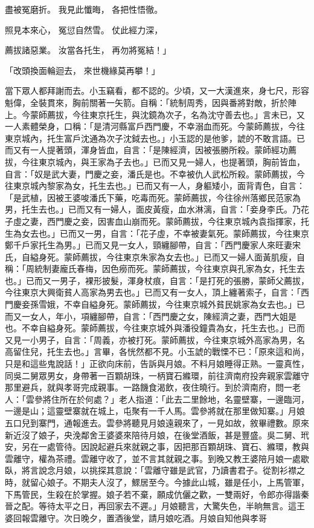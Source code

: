 \begin{showcontents}{}
盡被冤磨折。  我見此懺晦，  各把性悟徹。

照見本來心，  冤愆自然雪。  仗此經力深，

薦拔諸惡業。  汝當各托生，  再勿將冤結！」

「改頭換面輪迴去，  來世機緣莫再攀！」

當下眾人都拜謝而去。小玉竊看，都不認的。少頃，又一大漢進來，身七尺，形容魁偉，全裝貫來，胸前關著一矢箭。自稱：「統制周秀，因與番將對敵，折於陣上。今蒙師薦拔，今往東京托生，與沈鏡為次子，名為沈守善去也。」言未已，又一人素體榮身，口稱：「是清河縣富戶西門慶，不幸溺血而死。今蒙師薦拔，今往東京城內，托生富戶沈通為次子沈鉞去也。」小玉認的是他爹，諕的不敢言語。已而又有一人提著頭，渾身皆血，自言：「是陳經濟，因被張勝所殺。蒙師經功薦拔，今往東京城內，與王家為子去也。」已而又見一婦人，也提著頭，胸前皆血，自言：「奴是武大妻，門慶之妾，潘氏是也。不幸被仇人武松所殺。蒙師薦拔，今往東京城內黎家為女，托生去也。」已而又有一人，身軀矮小，面背青色，自言：「是武植，因被王婆唆潘氏下藥，吃毒而死。蒙師薦拔，今往徐州落鄉民范家為男，托生去也。」已而又有一婦人，面皮黃瘦，血水淋漓，自言：「妾身李氏。乃花子虛之妻，西門慶之妾，因害血山崩而死。蒙師薦拔，今往東京城內袁指揮家，托生為女去也。」已而又一男，自言：「花子虛，不幸被妻氣死。蒙師薦拔，今往東京鄭千戶家托生為男。」已而又見一女人，頸纏腳帶，自言：「西門慶家人來旺妻宋氏，自縊身死。蒙師薦拔，今往東京朱家為女去也。」已而又一婦人面黃肌瘦，自稱：「周統制妻龐氏春梅，因色癆而死。蒙師薦拔，今往東京與孔家為女，托生去也。」已而又一男子，裸形披髮，渾身杖痕，自言：「是打死的張勝，蒙師父薦拔，今往東京大興衛貧人高家為男去也。」已而又有一女人，頂上纏著索子，自言：「西門慶妾孫雪娥，不幸自縊身死。蒙師薦拔，今往東京城外貧民姚家為女去也。」已而又一女人，年小，項纏腳帶，自言：「西門慶之女，陳經濟之妻，西門大姐是也。不幸自縊身死。蒙師薦拔，今往東京城外與潘役鐘貴為女，托生去也。」已而又見一小男子，自言：「周義，亦被打死。蒙師薦拔，今往東京城外高家為男，名高留住兒，托生去也。」言畢，各恍然都不見。小玉諕的戰慄不已：「原來這和尚，只是和這些鬼說話！」正欲向床前，告訴與月娘。不料月娘睡得正熟。一靈真性，同吳二舅眾男女，身帶著一百顆胡珠，一柄寶石縧環，前往濟南府投奔親家雲離守那里避兵，就與孝哥完成親事。一路饑食渴飲，夜住曉行。到於濟南府，問一老人：「雲參將住所在於何處？」老人指道：「此去二里餘地，名靈壁寨，一邊臨河，一邊是山；這靈壁寨就在城上，屯聚有一千人馬。雲參將就在那里做知寨。」月娘五口兒到寨門，通報進去。雲參將聽見月娘遠親來了，一見如故，敘畢禮數。原來新近沒了娘子，央浼鄰舍王婆婆來陪待月娘，在後堂酒飯，甚是豐盛。吳二舅、玳安，另在一處管待。因說起避兵來就親之事，因把那百顆胡珠、寶石、縧環，教與雲離守，權為茶禮。雲離守收了，並不言其就親之事。到晚又教王婆陪月娘一處歇臥，將言說念月娘，以挑探其意說：「雲離守雖是武官，乃讀書君子。從割衫襟之時，就留心娘子。不期夫人沒了，鰥居至今。今據此山城，雖是任小，上馬管軍，下馬管民，生殺在於掌握。娘子若不棄，願成伉儷之歡，一雙兩好，令郎亦得諧秦晉之配。等待太平之日，再回家去不遲。」月娘聽言，大驚失色，半晌無言。這王婆回報雲離守。次日晚夕，置酒後堂，請月娘吃酒。月娘自知他與孝哥
\end{showcontents}
